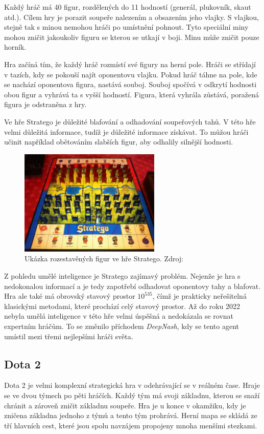 Každý hráč má 40 figur, rozdělených do 11 hodností (generál, plukovník, skaut atd.).
Cílem hry je porazit soupeře nalezením a obsazením jeho vlajky.
S vlajkou, stejně tak s minou nemohou hráči po umístnění pohnout.
Tyto speciální miny mohou zničit jakoukoliv figuru se kterou se utkají v boji.
Minu může zničit pouze horník.

Hra začíná tím, že každý hráč rozmístí své figury na herní pole.
Hráči se střídají v tazích, kdy se pokouší najít oponentovu vlajku.
Pokud hráč táhne na pole, kde se nachází oponentova figura, nastává souboj.
Souboj spočívá v odkrytí hodnosti obou figur a vyhrává ta s vyšší hodností.
Figura, která vyhrála zůstává, poražená figura je odstraněna z hry.

Ve hře Stratego je důležité blafování a odhadování soupeřových tahů.
V této hře velmi důležitá informace, tudíž je důležité informace získávat.
To můžou hráči učinit například obětováním slabších figur, aby odhalily silnější hodnosti.

\begin{figure}[H]
	\centering
	\includegraphics[width=0.6\textwidth]{obrazky-figures/stratego}
	\caption{Ukázka rozestavěných figur ve hře Stratego.
  Zdroj: \cite{Stratego_image}}\label{fig:figure2}
\end{figure}

Z pohledu umělé inteligence je Stratego zajímavý problém.
Nejenže je hra s nedokonalou informací a je tedy zapotřebí odhadovat oponentovy tahy a blafovat.
Hra ale také má obrovský stavový prostor $10^{535}$\cite{Perolat_2022}, čímž je prakticky neřešitelná klasickými metodami, které prochází celý stavový prostor.
Až do roku 2022 nebyla umělá inteligence v této hře velmi úspěšná a nedokázala se rovnat expertním hráčům.
To se změnilo příchodem \emph{DeepNash}\cite{Perolat_2022}, kdy se tento agent umístil mezi třemi nejlepšími hráči světa.

\subsection{Dota 2}\label{subsec:dota}
Dota 2 je velmi komplexní strategická hra v odehrávající se v reálném čase.
Hraje se ve dvou týmech po pěti hráčích.
Každý tým má svoji základnu, kterou se snaží chránit a zároveň zničit základnu soupeře.
Hra je u konce v okamžiku, kdy je zničena základna jednoho z týmů a tento tým prohrává.
Herní mapa se skládá ze tří hlavních cest, které jsou spolu navzájem propojeny mnoha menšími stezkami.

